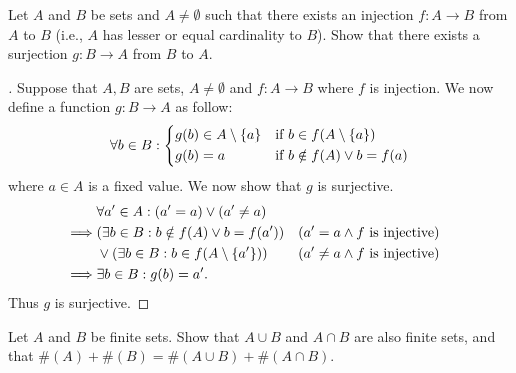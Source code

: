\begin{ex}\label{ex:3.6.8}
	Let \(A\) and \(B\) be sets and \(A \neq \emptyset\) such that there exists an injection \(f : A \to B\) from \(A\) to \(B\) (i.e., \(A\) has lesser or equal cardinality to \(B\)).
	Show that there exists a surjection \(g : B \to A\) from \(B\) to \(A\).
\end{ex}

\begin{proof}[]
	Suppose that \(A, B\) are sets, \(A \neq \emptyset\) and \(f : A \to B\) where \(f\) is injection.
	We now define a function \(g : B \to A\) as follow:
	\[
		\forall b \in B : \begin{dcases}
			g(b) \in A \setminus \left\lbrace a\right\rbrace & \text{if } b \in f(A \setminus \left\lbrace a\right\rbrace) \\
			g(b) = a                     & \text{if } b \notin f(A) \lor b = f(a)
		\end{dcases}
	\]
	where \(a \in A\) is a fixed value.
	We now show that \(g\) is surjective.
	\begin{align*}
		         & \forall a' \in A : (a' = a) \lor (a' \neq a)                                                            \\
		\implies & (\exists b \in B : b \notin f(A) \lor b = f(a'))       &  & \text{(\(a' = a \land f\) is injective)}    \\
		         & \lor (\exists b \in B : b \in f(A \setminus \left\lbrace a'\right\rbrace)) &  & \text{(\(a' \neq a \land f\) is injective)} \\
		\implies & \exists b \in B : g(b) = a'.
	\end{align*}
	Thus \(g\) is surjective.
\end{proof}

\begin{ex}\label{ex:3.6.9}
	Let \(A\) and \(B\) be finite sets.
	Show that \(A \cup B\) and \(A \cap B\) are also finite sets, and that \(\#(A) + \#(B) = \#(A \cup B) + \#(A \cap B)\).
\end{ex}

